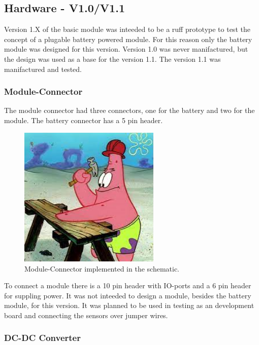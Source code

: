 \subsection{Hardware - V1.0/V1.1}
    Version 1.X of the basic module was inteeded to be a ruff prototype to test the concept of a 
    plugable battery powered module. For this reason only the battery module was designed for this
    version. Version 1.0 was never manifactured, but the design was used as a base for the
    version 1.1. The version 1.1 was manifactured and tested.

    \subsubsection{Module-Connector}
        The module connector had three connectors, one for the battery and two for the
        module. The battery connector has a 5 pin header. 

        \begin{figure}[H]
            \centering
            \includegraphics[width=0.6\textwidth]{assets/HW/TBD2.png}
            \caption{Module-Connector implemented in the schematic.}
        \end{figure}


        To connect a module there is a 10 pin header with IO-ports and a 6 pin header 
        for suppling power. It was not inteeded to design a module, besides the battery module,
        for this version. It was planned to be used in testing as an development board and connecting
        the sensors over jumper wires.

    \subsubsection{DC-DC Converter}
        
